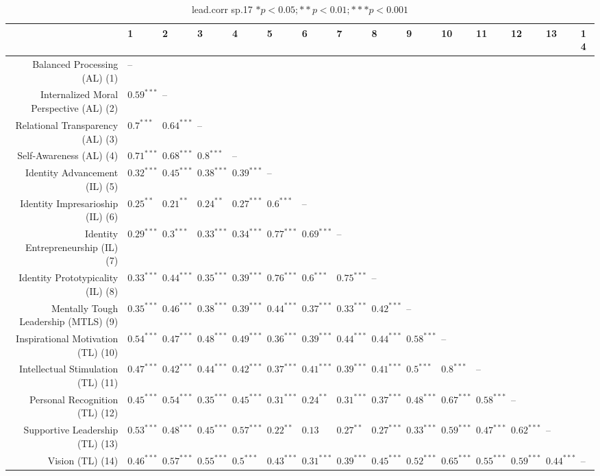 \begin{table}[ht]
\centering
\begin{tabular}{rllllllllllllll}
  \hline
 & 1 & 2 & 3 & 4 & 5 & 6 & 7 & 8 & 9 & 10 & 11 & 12 & 13 & 14 \\ 
  \hline
Balanced Processing (AL) (1) & -- &  &  &  &  &  &  &  &  &  &  &  &  &  \\ 
  Internalized Moral Perspective (AL) (2) & $0.59^{***}$ & -- &  &  &  &  &  &  &  &  &  &  &  &  \\ 
  Relational Transparency (AL) (3) & $0.7^{***}$ & $0.64^{***}$ & -- &  &  &  &  &  &  &  &  &  &  &  \\ 
  Self-Awareness (AL) (4) & $0.71^{***}$ & $0.68^{***}$ & $0.8^{***}$ & -- &  &  &  &  &  &  &  &  &  &  \\ 
  Identity Advancement (IL) (5) & $0.32^{***}$ & $0.45^{***}$ & $0.38^{***}$ & $0.39^{***}$ & -- &  &  &  &  &  &  &  &  &  \\ 
  Identity Impresarioship (IL) (6) & $0.25^{**}$ & $0.21^{**}$ & $0.24^{**}$ & $0.27^{***}$ & $0.6^{***}$ & -- &  &  &  &  &  &  &  &  \\ 
  Identity Entrepreneurship (IL) (7) & $0.29^{***}$ & $0.3^{***}$ & $0.33^{***}$ & $0.34^{***}$ & $0.77^{***}$ & $0.69^{***}$ & -- &  &  &  &  &  &  &  \\ 
  Identity Prototypicality (IL) (8) & $0.33^{***}$ & $0.44^{***}$ & $0.35^{***}$ & $0.39^{***}$ & $0.76^{***}$ & $0.6^{***}$ & $0.75^{***}$ & -- &  &  &  &  &  &  \\ 
  Mentally Tough Leadership (MTLS) (9) & $0.35^{***}$ & $0.46^{***}$ & $0.38^{***}$ & $0.39^{***}$ & $0.44^{***}$ & $0.37^{***}$ & $0.33^{***}$ & $0.42^{***}$ & -- &  &  &  &  &  \\ 
  Inspirational Motivation (TL) (10) & $0.54^{***}$ & $0.47^{***}$ & $0.48^{***}$ & $0.49^{***}$ & $0.36^{***}$ & $0.39^{***}$ & $0.44^{***}$ & $0.44^{***}$ & $0.58^{***}$ & -- &  &  &  &  \\ 
  Intellectual Stimulation (TL) (11) & $0.47^{***}$ & $0.42^{***}$ & $0.44^{***}$ & $0.42^{***}$ & $0.37^{***}$ & $0.41^{***}$ & $0.39^{***}$ & $0.41^{***}$ & $0.5^{***}$ & $0.8^{***}$ & -- &  &  &  \\ 
  Personal Recognition (TL) (12) & $0.45^{***}$ & $0.54^{***}$ & $0.35^{***}$ & $0.45^{***}$ & $0.31^{***}$ & $0.24^{**}$ & $0.31^{***}$ & $0.37^{***}$ & $0.48^{***}$ & $0.67^{***}$ & $0.58^{***}$ & -- &  &  \\ 
  Supportive Leadership (TL) (13) & $0.53^{***}$ & $0.48^{***}$ & $0.45^{***}$ & $0.57^{***}$ & $0.22^{**}$ & $0.13$ & $0.27^{**}$ & $0.27^{***}$ & $0.33^{***}$ & $0.59^{***}$ & $0.47^{***}$ & $0.62^{***}$ & -- &  \\ 
  Vision (TL) (14) & $0.46^{***}$ & $0.57^{***}$ & $0.55^{***}$ & $0.5^{***}$ & $0.43^{***}$ & $0.31^{***}$ & $0.39^{***}$ & $0.45^{***}$ & $0.52^{***}$ & $0.65^{***}$ & $0.55^{***}$ & $0.59^{***}$ & $0.44^{***}$ & -- \\ 
   \hline
\end{tabular}
\caption{lead.corr sp.17 $* p < 0.05; ** p < 0.01; *** p < 0.001$} 
\label{freq_corr.lead.corr.sp.17}
\end{table}
